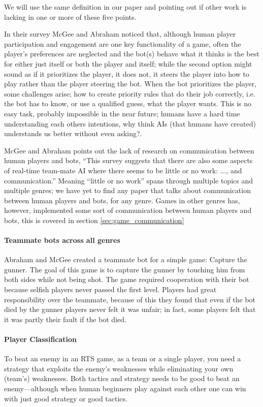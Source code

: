 We will use the same definition in our paper and pointing out if other work is lacking in one or more of these five points.

In their survey\cite{mcgee10} McGee and Abraham noticed that, although human player participation and engagement are one key functionality of a game\cite{reynolds03}, often the player's preferences are neglected and the bot(s) behave what it thinks is the best for either just itself or both the player and itself; while the second option might sound as if it prioritizes the player, it does not, it steers the player into how to play rather than the player steering the bot. When the bot prioritizes the player, some challenges arise; how to create priority rules that do their job correctly\cite{mcgee10}, i.e. the bot has to know, or use a qualified guess, what the player wants. This is no easy task, probably impossible in the near future; humans have a hard time understanding each others intentions, why think AIs (that humans have created) understands us better\cite{norman07} without even asking?.

McGee and Abraham points out the lack of research on communication between human players and bots, “This survey suggests that there are also some aspects of real-time team-mate AI where there seems to be little or no work: ..., and communication.”\cite{mcgee10} Meaning “little or no work” spans through multiple topics and multiple genres; we have yet to find any paper that talks about communication between human players and bots, for any genre. Games in other genres has, however, implemented some sort of communication between human players and bots, this is covered in section \ref{sec:game_communication}

\paragraph{Teammate bots across all genres}
Abraham and McGee created a teammate bot for a simple game: Capture the gunner\cite{abraham10}. The goal of this game is to capture the gunner by touching him from both sides while not being shot. The game required cooperation with their bot because selfish players never passed the first level. Players had great responsibility over the teammate, because of this they found that even if the bot died by the gunner players never felt it was unfair; in fact, some players felt that it was partly their fault if the bot died.


\paragraph{Player Classification}
To beat an enemy in an RTS game, as a team or a single player, you need a strategy that exploits the enemy’s weaknesses while eliminating your own (team’s) weaknesses. Both tactics and strategy needs to be good to beat an enemy—although when human beginners play against each other one can win with just good strategy or good tactics.

